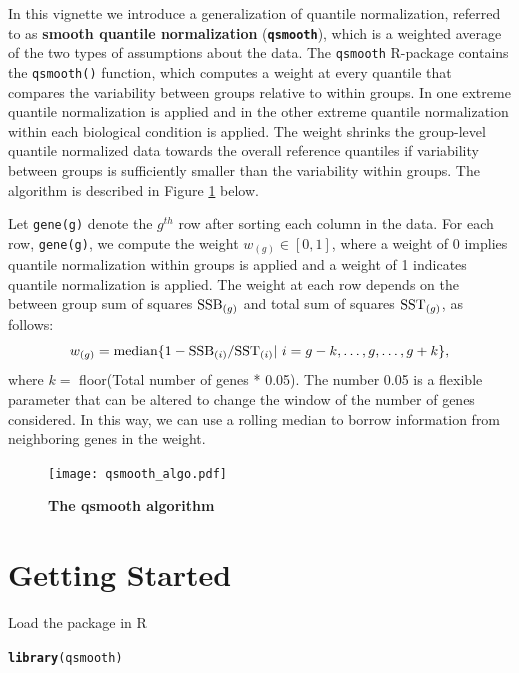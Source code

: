 \documentclass{article}\usepackage[]{graphicx}\usepackage[usenames,dvipsnames]{color}
\makeatletter
\newcommand{\hlstd}[1]{\textcolor[rgb]{0.345,0.345,0.345}{#1}}%
\newcommand{\hlkwd}[1]{\textcolor[rgb]{0.737,0.353,0.396}{\textbf{#1}}}%
\newenvironment{kframe}{%
 \def\at@end@of@kframe{}%
 \ifinner\ifhmode%
  \def\at@end@of@kframe{\end{minipage}}%
  \begin{minipage}{\columnwidth}%
 \fi\fi%
 \def\FrameCommand##1{\hskip\@totalleftmargin \hskip-\fboxsep
 \colorbox{shadecolor}{##1}\hskip-\fboxsep
     \hskip-\linewidth \hskip-\@totalleftmargin \hskip\columnwidth}%
 \MakeFramed {\advance\hsize-\width
   \@totalleftmargin\z@ \linewidth\hsize
   \@setminipage}}%
 {\par\unskip\endMakeFramed%
 \at@end@of@kframe}
\newenvironment{knitrout}{}{} %
\makeatother
\begin{document}
In this vignette we introduce a generalization of quantile normalization, 
referred to as \textbf{smooth quantile normalization} (\texttt{\bf{qsmooth}}), 
which is a weighted average of the two types of assumptions about the data. 
The \texttt{qsmooth} R-package contains the \texttt{qsmooth()} function, 
which computes a weight at every quantile that compares the variability between
groups relative to within groups. In one extreme quantile normalization is applied
and in the other extreme quantile normalization within each biological condition
is applied. The weight shrinks the group-level quantile normalized data
towards the overall reference quantiles if variability between groups is sufficiently smaller than
the variability within groups. 
The algorithm is described in Figure \ref{algo} below. 

Let \texttt{gene(g)} denote the ${g}^{th}$ row after sorting each column in the data. 
For each row, \texttt{gene(g)}, we compute the weight $w_{(g)} \in [0, 1]$, 
where a weight of 0 implies quantile normalization within groups is applied and
a weight of 1 indicates quantile normalization is applied.
The weight at each row depends on the between group sum of squares
$\hbox{SSB}_{(g)}$ and total sum of squares $\hbox{SST}_{(g)}$, 
as follows:
\begin{equation}
w_{(g)} = \hbox{median} \{1 - \hbox{SSB}_{(i)} / \hbox{SST}_{(i)} | ~i = g-k, \dots, g, \dots, g+k \},
\end{equation}
where $k=$ floor(Total number of genes * 0.05). The number 0.05 is a flexible 
parameter that can be altered to change the window of the number of genes 
considered. In this way, we can use a rolling median to borrow information 
from neighboring genes in the weight.

\begin{figure}[!h]
\begin{center}
\texttt{[image: qsmooth\_algo.pdf]}
\end{center}
\small\normalsize
\caption[qsmooth algorithm]
         {{\bf The qsmooth algorithm}}
\label{algo}
\end{figure}


\section{Getting Started}

Load the package in R
\begin{knitrout}
\color{fgcolor}\begin{kframe}
\begin{alltt}
\hlkwd{library}\hlstd{(qsmooth)}
\end{alltt}
\end{kframe}
\end{knitrout}
\end{document}
